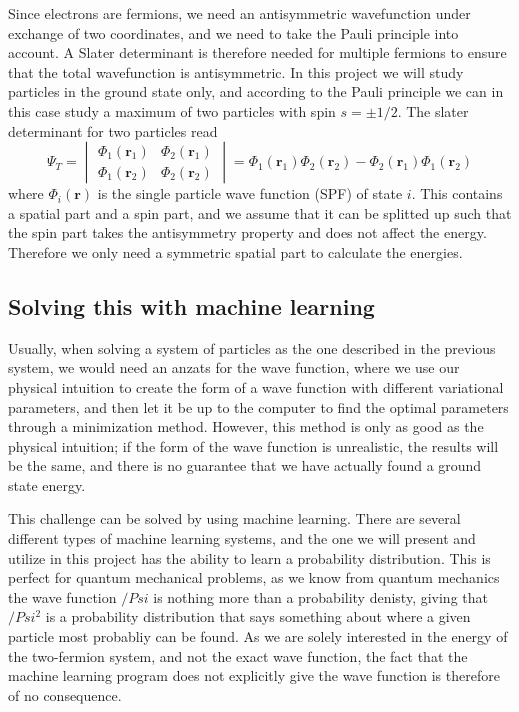 \documentclass[norsk,a4paper,12pt]{article}
\begin{document}
Since electrons are fermions, we need an antisymmetric wavefunction under exchange of two coordinates, and we need to take the Pauli principle into account. A Slater determinant is therefore needed for multiple fermions to ensure that the total wavefunction is antisymmetric. In this project we will study particles in the ground state only, and according to the Pauli principle we can in this case study a maximum of two particles with spin $s=\pm 1/2$. The slater determinant for two particles read
\begin{equation}
\Psi_T=
\begin{vmatrix}
\Phi_1(\boldsymbol{r}_1) & \Phi_2(\boldsymbol{r}_1)\\
\Phi_1(\boldsymbol{r}_2) & \Phi_2(\boldsymbol{r}_2)
\end{vmatrix}
=\Phi_1(\boldsymbol{r}_1)\Phi_2(\boldsymbol{r}_2)-\Phi_2(\boldsymbol{r}_1)\Phi_1(\boldsymbol{r}_2)
\end{equation}
where $\Phi_i(\boldsymbol{r})$ is the single particle wave function (SPF) of state $i$. This contains a spatial part and a spin part, and we assume that it can be splitted up such that the spin part takes the antisymmetry property and does not affect the energy. Therefore we only need a symmetric spatial part to calculate the energies.

\subsection{Solving this with machine learning}
Usually, when solving a system of particles as the one described in the previous system, we would need an anzats for the wave function, where we use our physical intuition to create the form of a wave function with different variational parameters, and then let it be up to the computer to find the optimal parameters through a minimization method. However, this method is only as good as the physical intuition; if the form of the wave function is unrealistic, the results will be the same, and there is no guarantee that we have actually found a ground state energy.
\par 
\vspace{3mm}
This challenge can be solved by using machine learning. There are several different types of machine learning systems, and the one we will present and utilize in this project has the ability to learn a probability distribution. This is perfect for quantum mechanical problems, as we know from quantum mechanics the wave function $/Psi$ is nothing more than a probability denisty, giving that $/Psi^2$ is a probability distribution that says something about where a given particle most probabliy can be found. As we are solely interested in the energy of the two-fermion system, and not the exact wave function, the fact that the machine learning program does not explicitly give the wave function is therefore of no consequence.
\end{document}
